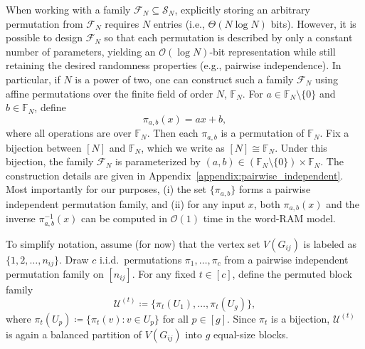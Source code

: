 \documentclass[journal]{IEEEtran}
\theoremstyle{definition}
\theoremstyle{definition}
\newcommand{\bigO}{\mathcal{O}}
\begin{document}
When working with a family \(\mathcal{F}_N \subseteq \mathcal{S}_N\), explicitly storing an arbitrary permutation from \(\mathcal{F}_N\) requires \(N\) entries (i.e., \(\Theta(N\log N)\) bits). However, it is possible to design $\mathcal{F}_N$ so that each permutation is described by only a constant number of parameters, yielding an $\bigO(\log N)$-bit representation while still retaining the desired randomness properties (e.g., pairwise independence). In particular, if $N$ is a power of two, one can construct such a family $\mathcal{F}_N$ using affine permutations over the finite field of order $N$, $\mathbb{F}_N$. For $a\in\mathbb{F}_N \setminus \{0\}$ and $b\in\mathbb{F}_N$, define
\[
\pi_{a,b}(x)=ax+b,
\]
where all operations are over $\mathbb{F}_N$. Then each $\pi_{a,b}$ is a permutation of $\mathbb{F}_N$. Fix a bijection between $[N]$ and $\mathbb{F}_N$, which we write as  $[N]\cong\mathbb{F}_N$. Under this bijection, the family $\mathcal{F}_N$ is parameterized by $(a,b)\in (\mathbb{F}_N \setminus \{0\})\times \mathbb{F}_N$.  The construction details are given in Appendix~\ref{appendix:pairwise_independent}. Most importantly for our purposes, (i) the set $\{\pi_{a,b}\}$ forms a pairwise independent permutation family, and (ii) for any input $x$, both $\pi_{a,b}(x)$ and the inverse $\pi_{a,b}^{-1}(x)$ can be computed in $\bigO(1)$ time in the word-RAM model. 


To simplify notation, assume (for now) that the vertex set \(V(G_{ij})\) is labeled as \(\{1,2,\dots,n_{ij}\}\). Draw \(c\) i.i.d.\ permutations \(\pi_1,\dots,\pi_c\) from a pairwise independent permutation family on $[n_{ij}]$. For any fixed \(t \in [c]\), define the permuted block family
\[
  \mathcal{U}^{(t)} \coloneqq \big\{\pi_t(U_1),\dots,\pi_t(U_{g})\big\},
\]
where \(\pi_t(U_p) \coloneqq \{\pi_t(v): v \in U_p\}\) for all \(p \in [g]\).
Since \(\pi_t\) is a bijection, \(\mathcal{U}^{(t)}\) is again a balanced partition of \(V(G_{ij})\) into \(g\) equal-size blocks.


\end{document}
